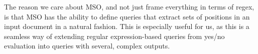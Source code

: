 
The reason we care about MSO, and not just frame everything in terms of regex, is that MSO has the ability to define queries that extract sets of positions in an input document in a natural fashion. This is especially useful for us, as this is a seamless way of extending regular expression-based queries from yes/no evaluation into queries with several, complex outputs.


